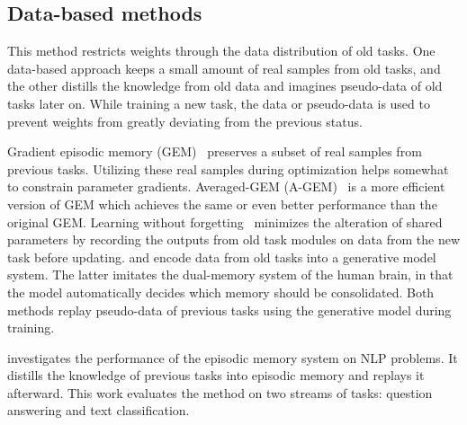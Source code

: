 \documentclass{article} %
\begin{document}
\subsection{Data-based methods}

This method restricts weights through the data distribution of old tasks. One data-based approach keeps a small amount of real samples from old tasks, and the other distills the knowledge from old data and imagines pseudo-data of old tasks later on. While training a new task, the data or pseudo-data is used to prevent weights from greatly deviating from the previous status.

Gradient episodic memory (GEM)~\citep{lopez2017gradient} preserves a subset of real samples from previous tasks.
Utilizing these real samples during optimization helps somewhat to constrain parameter gradients.
Averaged-GEM (A-GEM)~\citep{chaudhry2018efficient} is a more efficient version of GEM which achieves the same or even better performance than the original GEM. Learning without forgetting~\citep{li2017learning} minimizes the alteration of shared parameters by recording the outputs from old task modules on data from the new task before updating. \citet{shin2017continual} and \citet{kemker2017fearnet} encode data from old tasks into a generative model system. The latter imitates the dual-memory system of the human brain, in that the model automatically decides which memory should be consolidated. 
Both methods replay pseudo-data of previous tasks using the generative model during training. 

\citet{d2019episodic} investigates the performance of the episodic memory system on NLP problems. 
It distills the knowledge of previous tasks into episodic memory and replays it afterward.
This work evaluates the method on two streams of tasks: question answering and text classification.\\


\end{document}
